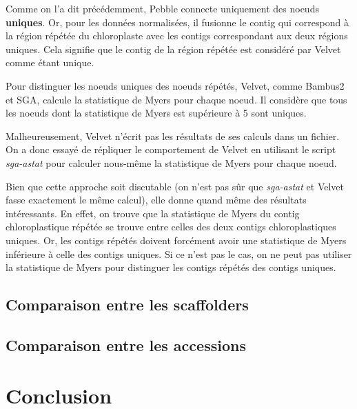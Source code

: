 \documentclass[a4paper]{article}
\begin{document}
Comme on l'a dit précédemment, Pebble connecte uniquement des noeuds \textbf{uniques}. Or, pour les données normalisées, il fusionne le contig qui correspond à la région répétée du chloroplaste avec les contigs correspondant aux deux régions uniques. Cela signifie que le contig de la région répétée est considéré par Velvet comme étant unique.

Pour distinguer les noeuds uniques des noeuds répétés, Velvet, comme Bambus2 et SGA, calcule la statistique de Myers pour chaque noeud. Il considère que tous les noeuds dont la statistique de Myers est supérieure à 5 sont uniques. \cite{velvetcode}

Malheureusement, Velvet n'écrit pas les résultats de ses calculs dans un fichier. On a donc essayé de répliquer le comportement de Velvet en utilisant le script \textit{sga-astat} pour calculer nous-même la statistique de Myers pour chaque noeud. 

Bien que cette approche soit discutable (on n'est pas sûr que \textit{sga-astat} et Velvet fasse exactement le même calcul), elle donne quand même des résultats intéressants. En effet, on trouve que la statistique de Myers du contig chloroplastique répétée se trouve entre celles des deux contigs chloroplastiques uniques. Or, les contigs répétés doivent forcément avoir une statistique de Myers inférieure à celle des contigs uniques. Si ce n'est pas le cas, on ne peut pas utiliser la statistique de Myers pour distinguer les contigs répétés des contigs uniques. 




\subsection{Comparaison entre les scaffolders}

\subsection{Comparaison entre les accessions}

\section{Conclusion}




\clearpage
{}

\end{document}
